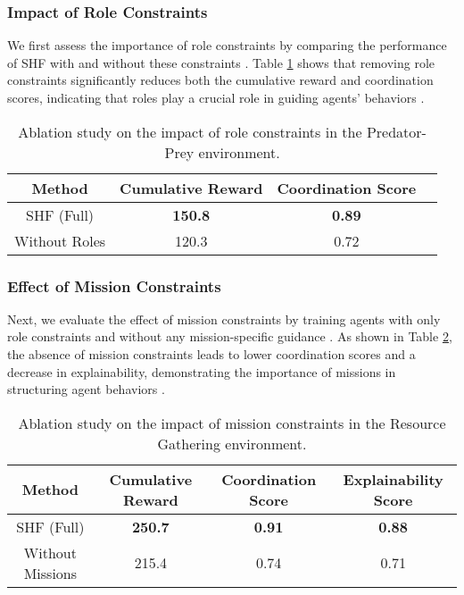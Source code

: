 \documentclass[sigconf,anonymous]{aamas}
\begin{document}
\subsubsection{Impact of Role Constraints}
We first assess the importance of role constraints by comparing the performance of SHF with and without these constraints \cite{hubner2010moise}. Table \ref{table:role_ablation} shows that removing role constraints significantly reduces both the cumulative reward and coordination scores, indicating that roles play a crucial role in guiding agents' behaviors \cite{hubner2010moise, castaneda2019policy}.

\begin{table}[ht]
\centering
\caption{Ablation study on the impact of role constraints in the Predator-Prey environment.}
\label{table:role_ablation}
\begin{tabular}{|c|c|c|c|}
\hline
\textbf{Method} & \textbf{Cumulative Reward} & \textbf{Coordination Score} \\ \hline
SHF (Full) & \textbf{150.8} & \textbf{0.89} \\ \hline
Without Roles & 120.3 & 0.72 \\ \hline
\end{tabular}
\end{table}


\subsubsection{Effect of Mission Constraints}
Next, we evaluate the effect of mission constraints by training agents with only role constraints and without any mission-specific guidance \cite{hubner2010moise}. As shown in Table \ref{table:mission_ablation}, the absence of mission constraints leads to lower coordination scores and a decrease in explainability, demonstrating the importance of missions in structuring agent behaviors \cite{hernandez2019survey}.

\begin{table}[ht]
\centering
\caption{Ablation study on the impact of mission constraints in the Resource Gathering environment.}
\label{table:mission_ablation}
\begin{tabular}{|c|c|c|c|}
\hline
\textbf{Method} & \textbf{Cumulative Reward} & \textbf{Coordination Score} & \textbf{Explainability Score} \\ \hline
SHF (Full) & \textbf{250.7} & \textbf{0.91} & \textbf{0.88} \\ \hline
Without Missions & 215.4 & 0.74 & 0.71 \\ \hline
\end{tabular}
\end{table}
\end{document}
